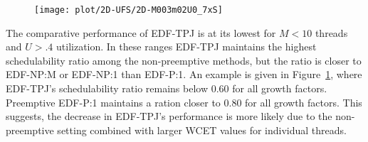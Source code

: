 \begin{figure}
  \texttt{[image: plot/2D-UFS/2D-M003m02U0\_7xS]}%
  \caption{}
  \label{fig:M3U.7}
\end{figure}

The comparative performance of EDF-TPJ is at its lowest
for ${M < 10}$ threads and ${U > .4}$ utilization. In these ranges
EDF-TPJ maintains the highest schedulability ratio among the
non-preemptive methods, but the ratio is closer to EDF-NP:M or
EDF-NP:1 than EDF-P:1. An example is given in Figure~\ref{fig:M3U.7}, where
EDF-TPJ's schedulability ratio remains below 0.60 for all growth
factors. Preemptive EDF-P:1 maintains a ration closer to 0.80 for all
growth factors. This suggests, the decrease in EDF-TPJ's
performance is more likely due to the non-preemptive setting combined
with larger WCET values for individual threads.

